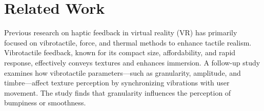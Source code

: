 \documentclass[a4paper,twocolumn]{article}
\begin{document}

\section{Related Work}
Previous research on haptic feedback in virtual reality (VR) has primarily focused on vibrotactile, force, and thermal methods to enhance tactile realism. Vibrotactile feedback\cite{10.1007/978-3-030-06134-0_25}, known for its compact size, affordability, and rapid response, effectively conveys textures and enhances immersion. A follow-up study\cite{10.1145/3025453.3025812} examines how vibrotactile parameters—such as granularity, amplitude, and timbre—affect texture perception by synchronizing vibrations with user movement. The study finds that granularity influences the perception of bumpiness or smoothness.
\end{document}
